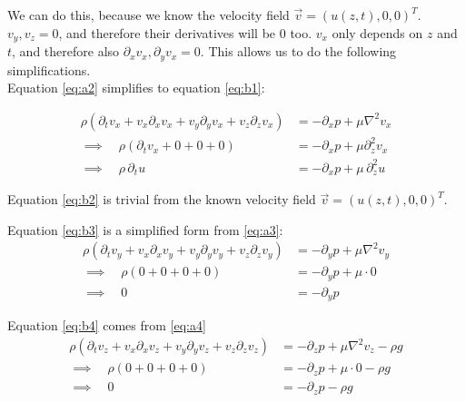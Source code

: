 \documentclass{article}
\begin{document}
We can do this, because we know the velocity field $\vec{v}=(u(z,t), 0, 0)^T$. $v_y, v_z=0$, and therefore their derivatives will be $0$ too. $v_x$ only depends on $z$ and $t$, and therefore also $\partial_x v_x, \partial_y v_x = 0$. This allows us to do the following simplifications. \\

Equation \ref{eq:a2} simplifies to equation \ref{eq:b1}:

\begin{align*}
\rho\left(\partial_{t} v_{x}+v_{x} \partial_{x} v_{x}+v_{y} \partial_{y} v_{x}+v_{z} \partial_{z} v_{x}\right) & =-\partial_{x} p+\mu \nabla^{2} v_{x} \\
\implies \quad \rho\left(\partial_{t} v_{x}+ 0 + 0 + 0 \right) & =-\partial_{x} p+\mu \partial_z^2v_x \\
\implies \quad \rho \,\partial_t u &= -\partial_x p + \mu \,\partial_z^2 u
\end{align*}

Equation \ref{eq:b2} is trivial from the known velocity field $\vec{v}=(u(z,t), 0, 0)^T$. \\

\vspace{5mm}

Equation \ref{eq:b3} is a simplified form from \ref{eq:a3}:
\begin{align*}
    \rho\left(\partial_{t} v_{y}+v_{x} \partial_{x} v_{y}+v_{y} \partial_{y} v_{y}+v_{z} \partial_{z} v_{y}\right) & =-\partial_{y} p+\mu \nabla^{2} v_{y} \\
    \implies \quad \rho\left(0 + 0 + 0 + 0\right) & =-\partial_{y} p+\mu \cdot 0 \\
    \implies \quad 0 &= -\partial_y p
\end{align*}

\vspace{5mm}

Equation \ref{eq:b4} comes from \ref{eq:a4}
\begin{align*}
    \rho\left(\partial_{t} v_{z}+v_{x} \partial_{x} v_{z}+v_{y} \partial_{y} v_{z}+v_{z} \partial_{z} v_{z}\right) & =-\partial_{z} p+\mu \nabla^{2} v_{z}-\rho g \\
    \implies \quad \rho\left( 0 + 0 + 0 + 0 \right) & =-\partial_{z} p+\mu \cdot 0 - \rho g \\
    \implies \quad 0 &= -\partial_z p - \rho g  
\end{align*}

\vspace{5mm}
\end{document}
